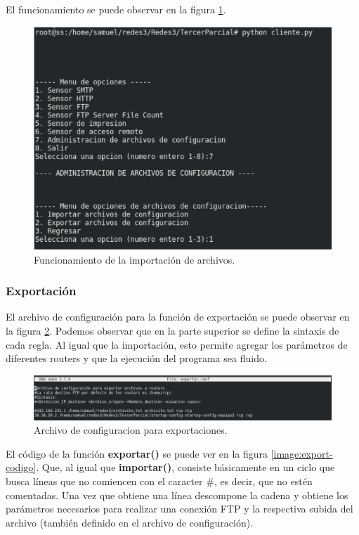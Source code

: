 El funcionamiento se puede observar en la figura \ref{image:import-func}.

\FloatBarrier
\begin{figure}[htbp!]
		\centering
			\includegraphics[width=.55 \textwidth]{images/import-func}
		\caption{Funcionamiento de la importación de archivos.}
		\label{image:import-func}
\end{figure}
\FloatBarrier

\subsubsection{Exportación}
El archivo de configuración para la función de exportación se puede observar en la figura \ref{image:export-conf}. Podemos observar que en la parte superior se define la sintaxis de cada regla. Al igual que la importación, esto permite agregar los parámetros de diferentes routers y que la ejecución del programa sea fluido.

\FloatBarrier
\begin{figure}[htbp!]
		\centering
			\includegraphics[width=1 \textwidth]{images/export-conf}
		\caption{Archivo de configuracion para exportaciones.}
		\label{image:export-conf}
\end{figure}
\FloatBarrier

El código de la función \textbf{exportar()} se puede ver en la figura \ref{image:export-codigo}. Que, al igual que \textbf{importar()}, consiste básicamente en un ciclo que busca líneas que no comiencen con el caracter \#, es decir, que no estén comentadas. Una vez que obtiene una línea descompone la cadena y obtiene los parámetros necesarios para realizar una conexión FTP y la respectiva subida del archivo (también definido en el archivo de configuración). 

